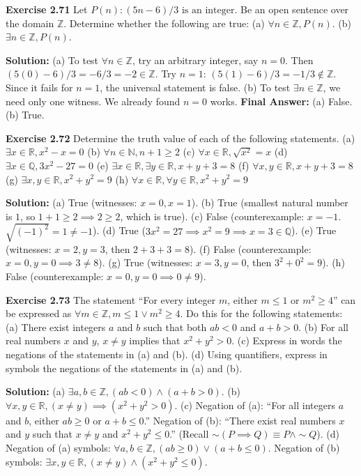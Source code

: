 \documentclass[12pt]{article}
\begin{document}
\textbf{Exercise 2.71}
Let $P(n): (5n - 6)/3 \text{ is an integer}$. Be an open sentence over the domain $\mathbb{Z}$. Determine whether the following are true:
(a) $\forall n \in \mathbb{Z}, P(n)$. \quad (b) $\exists n \in \mathbb{Z}, P(n)$.
\begin{mdframed}
\textbf{Solution:}
(a) To test $\forall n \in \mathbb{Z}$, try an arbitrary integer, say $n=0$. Then $(5(0)-6)/3 = -6/3 = -2 \in \mathbb{Z}$. Try $n=1$: $(5(1)-6)/3 = -1/3 \notin \mathbb{Z}$. Since it fails for $n=1$, the universal statement is false.
(b) To test $\exists n \in \mathbb{Z}$, we need only one witness. We already found $n=0$ works. 
\textbf{Final Answer:} (a) False. (b) True.
\end{mdframed}

\textbf{Exercise 2.72}
Determine the truth value of each of the following statements.
(a) $\exists x \in \mathbb{R}, x^2 - x = 0$
(b) $\forall n \in \mathbb{N}, n + 1 \ge 2$
(c) $\forall x \in \mathbb{R}, \sqrt{x^2} = x$
(d) $\exists x \in \mathbb{Q}, 3x^2 - 27 = 0$
(e) $\exists x \in \mathbb{R}, \exists y \in \mathbb{R}, x + y + 3 = 8$
(f) $\forall x, y \in \mathbb{R}, x + y + 3 = 8$
(g) $\exists x, y \in \mathbb{R}, x^2 + y^2 = 9$
(h) $\forall x \in \mathbb{R}, \forall y \in \mathbb{R}, x^2 + y^2 = 9$
\begin{mdframed}
\textbf{Solution:}
(a) True (witnesses: $x=0, x=1$).
(b) True (smallest natural number is $1$, so $1+1 \ge 2 \implies 2 \ge 2$, which is true).
(c) False (counterexample: $x=-1$. $\sqrt{(-1)^2} = 1 \neq -1$).
(d) True ($3x^2 = 27 \implies x^2 = 9 \implies x=3 \in \mathbb{Q}$).
(e) True (witnesses: $x=2, y=3$, then $2+3+3 = 8$).
(f) False (counterexample: $x=0, y=0 \implies 3 \neq 8$).
(g) True (witnesses: $x=3, y=0$, then $3^2+0^2 = 9$).
(h) False (counterexample: $x=0, y=0 \implies 0 \neq 9$).
\end{mdframed}

\textbf{Exercise 2.73}
The statement ``For every integer $m$, either $m \le 1$ or $m^2 \ge 4$'' can be expressed as $\forall m \in \mathbb{Z}, m \le 1 \lor m^2 \ge 4$. Do this for the following statements:
(a) There exist integers $a$ and $b$ such that both $ab < 0$ and $a + b > 0$.
(b) For all real numbers $x$ and $y$, $x \neq y$ implies that $x^2 + y^2 > 0$.
(c) Express in words the negations of the statements in (a) and (b).
(d) Using quantifiers, express in symbols the negations of the statements in (a) and (b).
\begin{mdframed}
\textbf{Solution:}
(a) $\exists a, b \in \mathbb{Z}, (ab < 0) \land (a + b > 0)$.
(b) $\forall x, y \in \mathbb{R}, (x \neq y) \implies (x^2 + y^2 > 0)$.
(c) Negation of (a): ``For all integers $a$ and $b$, either $ab \ge 0$ or $a + b \le 0$.''
Negation of (b): ``There exist real numbers $x$ and $y$ such that $x \neq y$ and $x^2 + y^2 \le 0$.'' (Recall $\sim(P \implies Q) \equiv P \land \sim Q$).
(d) Negation of (a) symbols: $\forall a, b \in \mathbb{Z}, (ab \ge 0) \lor (a + b \le 0)$.
Negation of (b) symbols: $\exists x, y \in \mathbb{R}, (x \neq y) \land (x^2 + y^2 \le 0)$.
\end{mdframed}
\end{document}
